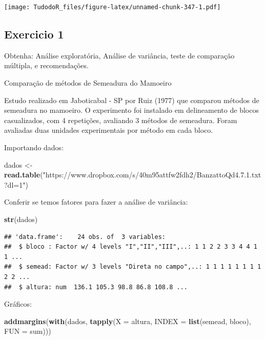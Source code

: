 \documentclass[
]{book}
\newenvironment{Shaded}{\begin{snugshade}}{\end{snugshade}}
\newcommand{\DataTypeTok}[1]{\textcolor[rgb]{0.13,0.29,0.53}{#1}}
\newcommand{\KeywordTok}[1]{\textcolor[rgb]{0.13,0.29,0.53}{\textbf{#1}}}
\newcommand{\NormalTok}[1]{#1}
\newcommand{\StringTok}[1]{\textcolor[rgb]{0.31,0.60,0.02}{#1}}
\begin{document}
\texttt{[image: TudodoR\_files/figure-latex/unnamed-chunk-347-1.pdf]}

\hypertarget{exercicio-1}{%
\subsection{Exercicio 1}\label{exercicio-1}}

Obtenha: Análise exploratória, Análise de variância, teste de comparação múltipla, e recomendações.

Comparação de métodos de Semeadura do Mamoeiro

Estudo realizado em Jaboticabal - SP por Ruiz (1977) que comparou métodos de semeadura no mamoeiro. O experimento foi instalado em delineamento de blocos casualizados, com 4 repetições, avaliando 3 métodos de semeadura. Foram avaliadas duas unidades experimentais por método em cada bloco.

Importando dados:

\begin{Shaded}
\begin{Highlighting}[]
\NormalTok{dados <-}\StringTok{ }\KeywordTok{read.table}\NormalTok{(}\StringTok{"https://www.dropbox.com/s/40m95attfw2fdh2/BanzattoQd4.7.1.txt?dl=1"}\NormalTok{) }
\end{Highlighting}
\end{Shaded}

Conferir se temos fatores para fazer a análise de variância:

\begin{Shaded}
\begin{Highlighting}[]
\KeywordTok{str}\NormalTok{(dados)}
\end{Highlighting}
\end{Shaded}

\begin{verbatim}
## 'data.frame':    24 obs. of  3 variables:
##  $ bloco : Factor w/ 4 levels "I","II","III",..: 1 1 2 2 3 3 4 4 1 1 ...
##  $ semead: Factor w/ 3 levels "Direta no campo",..: 1 1 1 1 1 1 1 1 2 2 ...
##  $ altura: num  136.1 105.3 98.8 86.8 108.8 ...
\end{verbatim}

Gráficos:

\begin{Shaded}
\begin{Highlighting}[]
\KeywordTok{addmargins}\NormalTok{(}\KeywordTok{with}\NormalTok{(dados,}
  \KeywordTok{tapply}\NormalTok{(}\DataTypeTok{X =}\NormalTok{ altura,}
    \DataTypeTok{INDEX =} \KeywordTok{list}\NormalTok{(semead, bloco),}
    \DataTypeTok{FUN =}\NormalTok{ sum)))}
\end{Highlighting}
\end{Shaded}
\end{document}

